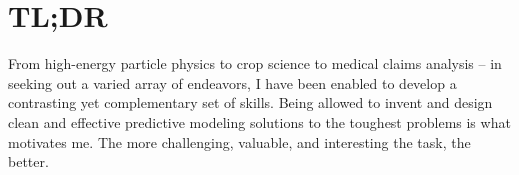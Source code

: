\section{\textbf{TL;DR}}
	From high-energy particle physics to crop science to medical claims analysis -- in seeking out a varied array of endeavors, I have been enabled to develop a contrasting yet complementary set of skills. Being allowed to invent and design clean and effective predictive modeling solutions to the toughest problems is what motivates me. The more challenging, valuable, and interesting the task, the better.